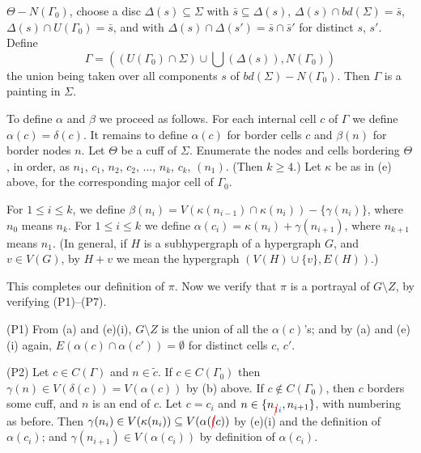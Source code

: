 \noindent $\Theta - N(\Gamma_0)$, choose a disc $\Delta(s) \subseteq \Sigma$ with $\bar{s} \subseteq \Delta(s)$, $\Delta(s) \cap bd(\Sigma) = \bar{s}$, $\Delta(s) \cap U(\Gamma_0) = \bar{s}$, and with $\Delta(s) \cap \Delta(s') = \bar{s} \cap \bar{s}'$ for distinct $s$, $s'$. Define
\begin{equation*}
\Gamma = \left( (U(\Gamma_0) \cap \Sigma) \cup \bigcup (\Delta(s)), N(\Gamma_0) \right)
\end{equation*}
the union being taken over all components $s$ of $bd(\Sigma) - N(\Gamma_0)$. Then $\Gamma$ is a painting in $\Sigma$.

To define $\alpha$ and $\beta$ we proceed as follows. For each internal cell $c$ of $\Gamma$ we define $\alpha(c) = \delta(c)$. It remains to define $\alpha(c)$ for border cells $c$ and $\beta(n)$ for border nodes $n$. Let $\Theta$ be a cuff of $\Sigma$. Enumerate the nodes and cells bordering $\Theta$, in order, as $n_1$, $c_1$, $n_2$, $c_2$, ..., $n_k$, $c_k$, $(n_1)$. (Then $k \ge 4$.) Let $\kappa$ be as in (e) above, for the corresponding major cell of $\Gamma_0$.

For $1 \le i \le k$, we define $\beta(n_i) = V(\kappa(n_{i-1}) \cap \kappa(n_i)) - \{\gamma(n_i)\}$, where $n_0$ means $n_k$. For $1 \le i \le k$ we define $\alpha(c_i) = \kappa(n_i) + \gamma(n_{i+1})$, where $n_{k+1}$ means $n_1$. (In general, if $H$ is a subhypergraph of a hypergraph $G$, and $v \in V(G)$, by $H + v$ we mean the hypergraph $(V(H) \cup \{v\}, E(H))$.)

This completes our definition of $\pi$. Now we verify that $\pi$ is a portrayal of $G \setminus Z$, by verifying (P1)--(P7).

\hspace*{12pt}(P1) From (a) and (e)(i), $G \setminus Z$ is the union of all the $\alpha(c)$'s; and by (a) and (e)(i) again, $E(\alpha(c) \cap \alpha(c')) = \emptyset$ for distinct cells $c$, $c'$.

\hspace*{12pt}(P2) Let $c \in C(\Gamma)$ and $n \in \tilde{c}$. If $c \in C(\Gamma_0)$ then $\gamma(n) \in V(\delta(c)) = V(\alpha(c))$ by (b) above. If $c \notin C(\Gamma_0)$, then $c$ borders some cuff, and $n$ is an end of $c$. Let $c = c_i$ and $n \in \{n_{\delm{1}\fix{i}}, n_{i+1}\}$, with numbering as before. Then $\gamma(n_i) \in V(\kappa(n_i)) \subseteq V(\alpha(\delm{(}c))$ by (e)(i) and the definition of $\alpha(c_i)$; and $\gamma(n_{i+1}) \in V(\alpha(c_i))$ by definition of $\alpha(c_i)$.

